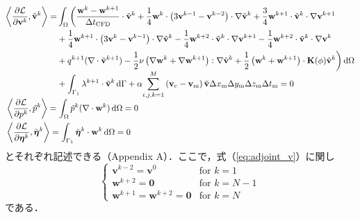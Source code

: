 \documentclass[a4paper,xelatex,ja=standard]{bxjsarticle}
\begin{document}
\begin{align}
    &\begin{aligned}
        \label{eq:adjoint_v}
        \left\langle\frac{\partial \mathcal{L}}{\partial \mathbf{v}^k}, \tilde{\mathbf{v}}^k\right\rangle
        = &\int_{\Omega} \bigg( \frac{\mathbf{w}^{k} - \mathbf{w}^{k+1}}{\Delta t_{\text{CFD}}} \cdot \tilde{\mathbf{v}}^k
        + \frac{1}{4} \mathbf{w}^{k} \cdot \left( 3\mathbf{v}^{k-1} - \mathbf{v}^{k-2} \right) \cdot \nabla \tilde{\mathbf{v}}^{k}
        + \frac{3}{4} \mathbf{w}^{k+1} \cdot \tilde{\mathbf{v}}^k \cdot \nabla \mathbf{v}^{k+1} \\ 
        &+ \frac{1}{4} \mathbf{w}^{k+1} \cdot \left( 3\mathbf{v}^k - \mathbf{v}^{k-1} \right) \cdot \nabla \tilde{\mathbf{v}}^{k}
        - \frac{1}{4} \mathbf{w}^{k+2} \cdot \tilde{\mathbf{v}}^{k} \cdot \nabla \mathbf{v}^{k+1} 
        - \frac{1}{4}  \mathbf{w}^{k+2} \cdot \tilde{\mathbf{v}}^{k} \cdot \nabla \mathbf{v}^{k} \\
        & +  q^{k+1} (\nabla \cdot \tilde{\mathbf{v}}^{k+1})
        - \frac{1}{2} \nu \left(\nabla \mathbf{w}^{k} + \nabla \mathbf{w}^{k+1}\right) : \nabla \tilde{\mathbf{v}}^k
        + \frac{1}{2} \left(\mathbf{w}^{k} + \mathbf{w}^{k+1}\right) \cdot \mathbf{K}(\phi) \tilde{\mathbf{v}}^k 
        \bigg) \, \mathrm{d}\Omega \\
        &+ \int_{\Gamma_1} \lambda^{k+1} \cdot \tilde{\mathbf{v}}^{k} \, \mathrm{d}\Gamma
        + \alpha \smash{\sum_{i, j, k=1}^{M}} \left(\mathbf{v}_\text{c}-\mathbf{v}_{\text{m}}\right) \tilde{\mathbf{v}} \Delta x_{\mathrm{m}} \Delta y_{\mathrm{m}} \Delta z_{\mathrm{m}} \Delta t_{\mathrm{m}}
        = 0
    \end{aligned} \\
    \label{eq:adjoint_p} 
    & \left\langle\frac{\partial \mathcal{L}}{\partial p^k}, \tilde{p}^k\right\rangle
    =\int_{\Omega} \tilde{p}^k(\nabla \cdot \mathbf{w}^{k}) \, \mathrm{d}\Omega 
    = 0 \\
    \label{eq:adjoint_eta} 
    &\left\langle\frac{\partial \mathcal{L}}{\partial \boldsymbol{\eta}^k}, \tilde{\boldsymbol{\eta}}^k\right\rangle
    =\int_{\Gamma_1} \tilde{\boldsymbol{\eta}}^k \cdot \mathbf{w}^k \, \mathrm{d}\Omega 
    = 0
\end{align}
とそれぞれ記述できる（Appendix A）．ここで，式（\ref{eq:adjoint_v}）に関し
\begin{equation}
    \begin{cases}
        \displaystyle \mathbf{v}^{k-2} = \mathbf{v}^{0} & \text{for } k=1 \\
        \displaystyle \mathbf{w}^{k+2} = \mathbf{0} & \text{for } k=N-1 \\
        \displaystyle \mathbf{w}^{k+1} = \mathbf{w}^{k+2} = \mathbf{0} & \text{for } k=N
    \end{cases}
\end{equation}
である．
\end{document}
